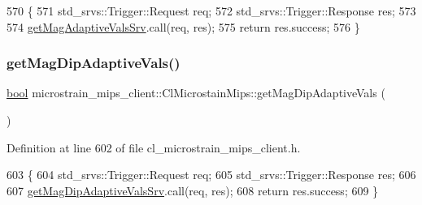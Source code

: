 \begin{DoxyCode}
570     \{
571         std\_srvs::Trigger::Request req;
572         std\_srvs::Trigger::Response res;
573 
574         \hyperlink{classmicrostrain__mips__client_1_1ClMicrostainMips_a99f756ab750211672215ab77798d2a87}{getMagAdaptiveValsSrv}.call(req, res);
575         \textcolor{keywordflow}{return} res.success;
576     \}
\end{DoxyCode}
\mbox{\label{classmicrostrain__mips__client_1_1ClMicrostainMips_aacbab8475cb965450ed2c6713deeadcb}} 
\subsubsection{\texorpdfstring{get\+Mag\+Dip\+Adaptive\+Vals()}{getMagDipAdaptiveVals()}}
{\footnotesize\ttfamily \hyperlink{classbool}{bool} microstrain\+\_\+mips\+\_\+client\+::\+Cl\+Microstain\+Mips\+::get\+Mag\+Dip\+Adaptive\+Vals (\begin{DoxyParamCaption}{ }\end{DoxyParamCaption})\hspace{0.3cm}{\ttfamily [inline]}}



Definition at line 602 of file cl\+\_\+microstrain\+\_\+mips\+\_\+client.\+h.


\begin{DoxyCode}
603     \{
604         std\_srvs::Trigger::Request req;
605         std\_srvs::Trigger::Response res;
606 
607         \hyperlink{classmicrostrain__mips__client_1_1ClMicrostainMips_a748591fd9e95377d11790521ba8cc853}{getMagDipAdaptiveValsSrv}.call(req, res);
608         \textcolor{keywordflow}{return} res.success;
609     \}
\end{DoxyCode}
\mbox{\label{classmicrostrain__mips__client_1_1ClMicrostainMips_ad8433e7aa2ed4dea2bf69c83d57e5e45}} 
